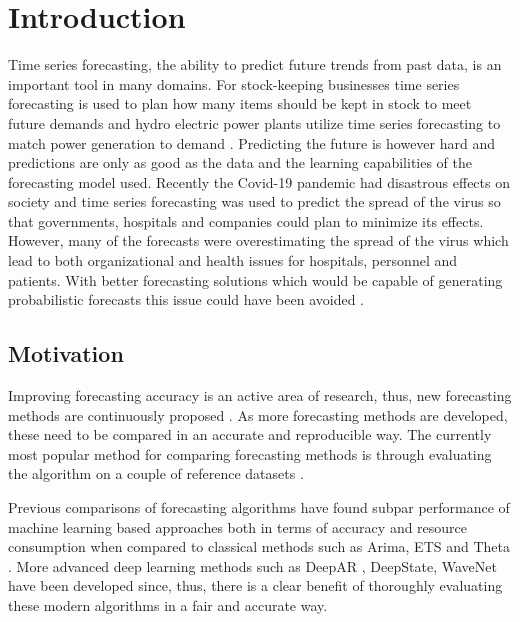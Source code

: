 \chapter{Introduction\label{cha:chapter1}}
Time series forecasting, the ability to predict future trends from past data, is an important tool in many domains. For stock-keeping businesses time series forecasting is used to plan how many items should be kept in stock to meet future demands and hydro electric power plants utilize time series forecasting to match power generation to demand \cite{rangapuram_deep_2018, pena2009capacity}. Predicting the future is however hard and predictions are only as good as the data and the learning capabilities of the forecasting model used. Recently the Covid-19 pandemic had disastrous effects on society and time series forecasting was used to predict the spread of the virus so that governments, hospitals and companies could plan to minimize its effects. However, many of the forecasts were overestimating the spread of the virus which lead to both organizational and health issues for hospitals, personnel and patients. With better forecasting solutions which would be capable of generating probabilistic forecasts this issue could have been avoided \cite{IOANNIDIS2020}.

\section{Motivation}
Improving forecasting accuracy is an active area of research, thus, new forecasting methods are continuously proposed \cite{salinas_deepar_2019,rangapuram_deep_2018,oord_wavenet_2016,oreshkin_n_beats_2020,salinas_high-dimensional_2019}. As more forecasting methods are developed, these need to be compared in an accurate and reproducible way. The currently most popular method for comparing forecasting methods is through evaluating the algorithm on a couple of reference datasets \cite{hyndman_forecasting_3rd}.

Previous comparisons of forecasting algorithms have found subpar performance of machine learning based approaches both in terms of accuracy and resource consumption when compared to classical methods such as Arima, ETS and Theta \cite{m3_competition,makridakis_m4_2020,other_thesis,ahmed_empirical_2010}. More advanced deep learning methods such as DeepAR \cite{salinas_deepar_2019}, DeepState\cite{rangapuram_deep_2018}, WaveNet \cite{oord_wavenet_2016} have been developed since, thus, there is a clear benefit of thoroughly evaluating these modern algorithms in a fair and accurate way.

